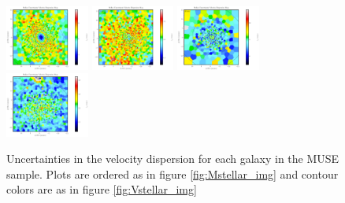 \begin{figure}
      \centering
      \includegraphics[width=0.245\textwidth]{Mmaps/ic1459_stellar_sigma_uncert.png}
      \includegraphics[width=0.245\textwidth]{Mmaps/ngc1316_stellar_sigma_uncert.png}
      \includegraphics[width=0.245\textwidth]{Mmaps/ic4296_stellar_sigma_uncert.png}
      \includegraphics[width=0.245\textwidth]{Mmaps/ngc1399_stellar_sigma_uncert.png}
      \caption[MUSE dispersion uncertocity maps]{Uncertainties in the velocity dispersion for each galaxy in the MUSE sample. Plots are ordered as in figure \ref{fig:Mstellar_img} and contour colors are as in figure \ref{fig:Vstellar_img}}
      \label{fig:Mstellar_sigma_uncert}
\end{figure}